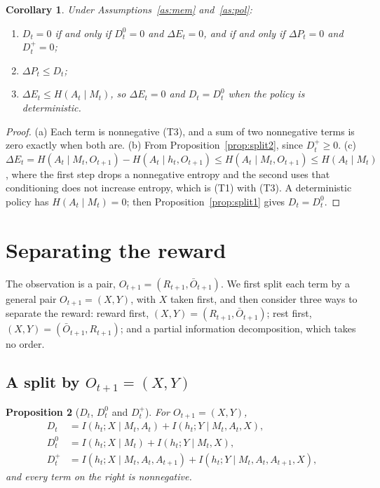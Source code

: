 \documentclass{article}
\newtheorem{proposition}{Proposition}[section]
\newtheorem{corollary}[proposition]{Corollary}
\theoremstyle{definition}
\theoremstyle{remark}
\newcommand{\dE}{\Delta E}
\newcommand{\dP}{\Delta P}
\newcommand{\Ob}{\bar O}
\begin{document}
\begin{corollary}\label{cor:consequences}
Under Assumptions~\ref{as:mem} and~\ref{as:pol}:
\begin{enumerate}
\item[(a)] $D_t=0$ if and only if $D^0_t=0$ and $\dE_t=0$, and if and only if $\dP_t=0$ and $D^+_t=0$;
\item[(b)] $\dP_t\le D_t$;
\item[(c)] $\dE_t\le H(A_t\mid M_t)$, so $\dE_t=0$ and $D_t=D^0_t$ when the policy is deterministic.
\end{enumerate}
\end{corollary}

\begin{proof}
(a) Each term is nonnegative (T3), and a sum of two nonnegative terms is zero exactly when both are. (b) From Proposition~\ref{prop:split2}, since $D^+_t\ge0$. (c) $\dE_t=H(A_t\mid M_t,O_{t+1})-H(A_t\mid h_t,O_{t+1})\le H(A_t\mid M_t,O_{t+1})\le H(A_t\mid M_t)$, where the first step drops a nonnegative entropy and the second uses that conditioning does not increase entropy, which is (T1) with (T3). A deterministic policy has $H(A_t\mid M_t)=0$; then Proposition~\ref{prop:split1} gives $D_t=D^0_t$.
\end{proof}

\section{Separating the reward}\label{sec:reward}

The observation is a pair, $O_{t+1}=(R_{t+1},\Ob_{t+1})$. We first split each term by a general pair $O_{t+1}=(X,Y)$, with $X$ taken first, and then consider three ways to separate the reward: reward first, $(X,Y)=(R_{t+1},\Ob_{t+1})$; rest first, $(X,Y)=(\Ob_{t+1},R_{t+1})$; and a partial information decomposition, which takes no order.

\subsection{A split by $O_{t+1}=(X,Y)$}

\begin{proposition}[$D_t$, $D^0_t$ and $D^+_t$]\label{prop:xy-D}
For $O_{t+1}=(X,Y)$,
\begin{align*}
D_t&=I(h_t;X\mid M_t,A_t)+I(h_t;Y\mid M_t,A_t,X),\\
D^0_t&=I(h_t;X\mid M_t)+I(h_t;Y\mid M_t,X),\\
D^+_t&=I(h_t;X\mid M_t,A_t,A_{t+1})+I(h_t;Y\mid M_t,A_t,A_{t+1},X),
\end{align*}
and every term on the right is nonnegative.
\end{proposition}
\end{document}
